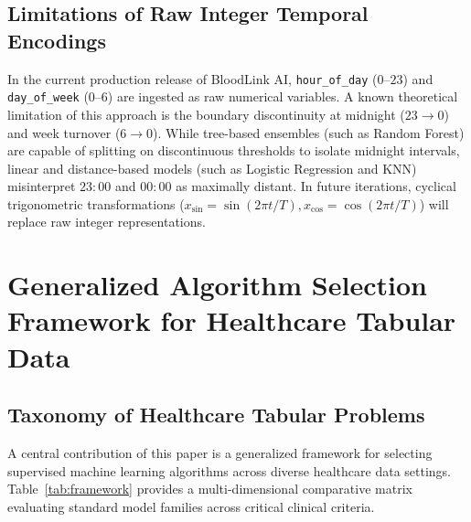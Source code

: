 \documentclass[conference]{IEEEtran}
\begin{document}
\subsection{Limitations of Raw Integer Temporal Encodings}
In the current production release of BloodLink AI, \texttt{hour\_of\_day} ($0$--$23$) and \texttt{day\_of\_week} ($0$--$6$) are ingested as raw numerical variables. A known theoretical limitation of this approach is the boundary discontinuity at midnight ($23 \to 0$) and week turnover ($6 \to 0$). While tree-based ensembles (such as Random Forest) are capable of splitting on discontinuous thresholds to isolate midnight intervals, linear and distance-based models (such as Logistic Regression and KNN) misinterpret $23:00$ and $00:00$ as maximally distant. In future iterations, cyclical trigonometric transformations ($x_{\sin} = \sin(2\pi t / T), x_{\cos} = \cos(2\pi t / T)$) will replace raw integer representations.

\section{Generalized Algorithm Selection Framework for Healthcare Tabular Data}

\subsection{Taxonomy of Healthcare Tabular Problems}
A central contribution of this paper is a generalized framework for selecting supervised machine learning algorithms across diverse healthcare data settings. Table~\ref{tab:framework} provides a multi-dimensional comparative matrix evaluating standard model families across critical clinical criteria.
\end{document}
